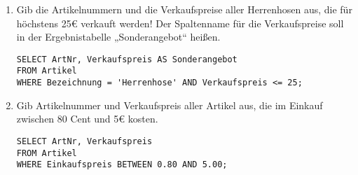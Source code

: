 \documentclass{bschlangaul-aufgabe}
\begin{document}
\begin{enumerate}

\item Gib die Artikelnummern und die Verkaufspreise aller Herrenhosen
aus, die für höchstens 25€ verkauft werden! Der Spaltenname für die
Verkaufspreise soll in der Ergebnistabelle „Sonderangebot“ heißen.

\begin{bAntwort}
\begin{verbatim}
SELECT ArtNr, Verkaufspreis AS Sonderangebot
FROM Artikel
WHERE Bezeichnung = 'Herrenhose' AND Verkaufspreis <= 25;
\end{verbatim}
\end{bAntwort}


\item Gib Artikelnummer und Verkaufspreis aller Artikel aus, die im
Einkauf zwischen 80 Cent und 5€ kosten.

\begin{bAntwort}
\begin{verbatim}
SELECT ArtNr, Verkaufspreis
FROM Artikel
WHERE Einkaufspreis BETWEEN 0.80 AND 5.00;
\end{verbatim}
\end{bAntwort}
\end{enumerate}

%

\end{document}
